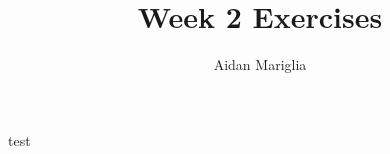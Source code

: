 \documentclass[12pt]{article}
\title{Week 2 Exercises}
\author{Aidan Mariglia}
\begin{document}
    test
\end{document}
